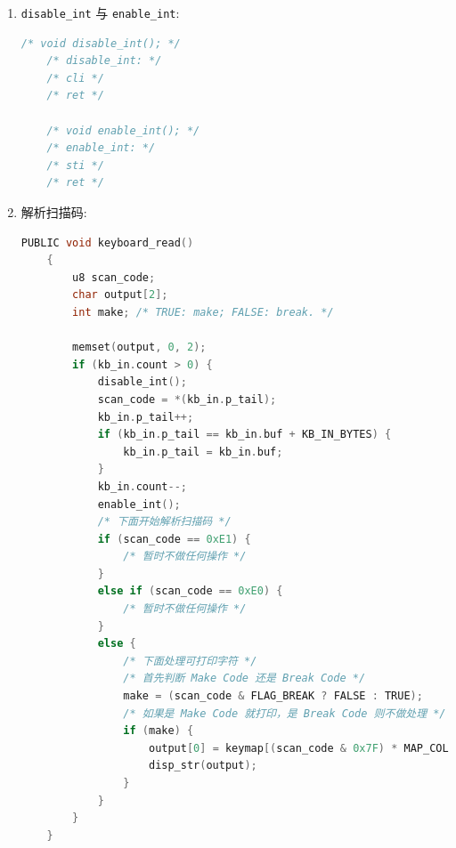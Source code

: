 \begin{enumerate}
    \item \texttt{disable\_int} 与 \texttt{enable\_int}:
    \begin{lstlisting}[language=C]
    /* void disable_int(); */
    /* disable_int: */
    /* cli */
    /* ret */
    
    /* void enable_int(); */
    /* enable_int: */
    /* sti */
    /* ret */
    \end{lstlisting}
    
    \item 解析扫描码:
    \begin{lstlisting}[language=C]
    PUBLIC void keyboard_read()
    {
        u8 scan_code;
        char output[2];
        int make; /* TRUE: make; FALSE: break. */
    
        memset(output, 0, 2);
        if (kb_in.count > 0) {
            disable_int();
            scan_code = *(kb_in.p_tail);
            kb_in.p_tail++;
            if (kb_in.p_tail == kb_in.buf + KB_IN_BYTES) {
                kb_in.p_tail = kb_in.buf;
            }
            kb_in.count--;
            enable_int();
            /* 下面开始解析扫描码 */
            if (scan_code == 0xE1) {
                /* 暂时不做任何操作 */
            }
            else if (scan_code == 0xE0) {
                /* 暂时不做任何操作 */
            }
            else {
                /* 下面处理可打印字符 */
                /* 首先判断 Make Code 还是 Break Code */
                make = (scan_code & FLAG_BREAK ? FALSE : TRUE);
                /* 如果是 Make Code 就打印，是 Break Code 则不做处理 */
                if (make) {
                    output[0] = keymap[(scan_code & 0x7F) * MAP_COLS];
                    disp_str(output);
                }
            }
        }
    }
    \end{lstlisting}
\end{enumerate}


